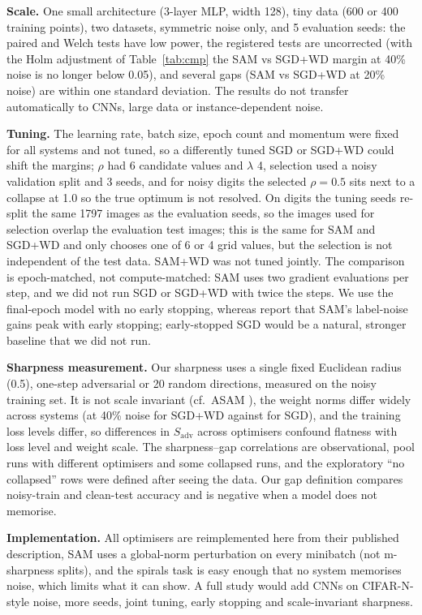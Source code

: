 \textbf{Scale.} One small architecture (3-layer MLP, width 128), tiny data (600 or 400 training points), two datasets, symmetric noise only, and 5 evaluation seeds: the paired and Welch tests have low power, the registered tests are uncorrected (with the Holm adjustment of Table~\ref{tab:cmp} the SAM vs SGD+WD margin at 40\% noise is no longer below 0.05), and several gaps (SAM vs SGD+WD at 20\% noise) are within one standard deviation. The results do not transfer automatically to CNNs, large data or instance-dependent noise.

\textbf{Tuning.} The learning rate, batch size, epoch count and momentum were fixed for all systems and not tuned, so a differently tuned SGD or SGD+WD could shift the margins; $\rho$ had 6 candidate values and $\lambda$ 4, selection used a noisy validation split and 3 seeds, and for noisy digits the selected $\rho=0.5$ sits next to a collapse at 1.0 so the true optimum is not resolved. On digits the tuning seeds re-split the same 1797 images as the evaluation seeds, so the images used for selection overlap the evaluation test images; this is the same for SAM and SGD+WD and only chooses one of 6 or 4 grid values, but the selection is not independent of the test data. SAM+WD was not tuned jointly. The comparison is epoch-matched, not compute-matched: SAM uses two gradient evaluations per step, and we did not run SGD or SGD+WD with twice the steps. We use the final-epoch model with no early stopping, whereas \cite{baek2024why} report that SAM's label-noise gains peak with early stopping; early-stopped SGD would be a natural, stronger baseline that we did not run.

\textbf{Sharpness measurement.} Our sharpness uses a single fixed Euclidean radius (0.5), one-step adversarial or 20 random directions, measured on the noisy training set. It is not scale invariant (cf.\ ASAM \cite{kwon2021asam}), the weight norms differ widely across systems (at 40\% noise  for SGD+WD against  for SGD), and the training loss levels differ, so differences in $S_{\mathrm{adv}}$ across optimisers confound flatness with loss level and weight scale. The sharpness--gap correlations are observational, pool runs with different optimisers and some collapsed runs, and the exploratory ``no collapsed'' rows were defined after seeing the data. Our gap definition compares noisy-train and clean-test accuracy and is negative when a model does not memorise.

\textbf{Implementation.} All optimisers are reimplemented here from their published description, SAM uses a global-norm perturbation on every minibatch (not m-sharpness splits), and the spirals task is easy enough that no system memorises noise, which limits what it can show. A full study would add CNNs on CIFAR-N-style noise, more seeds, joint tuning, early stopping and scale-invariant sharpness.
